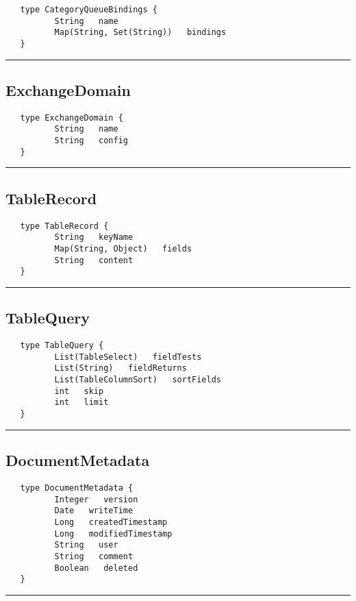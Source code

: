 \begin{verbatim}
   type CategoryQueueBindings {
          String   name
          Map(String, Set(String))   bindings
   }
\end{verbatim}

\rule{15cm}{2pt}
\subsection{ExchangeDomain}
\label{type:ExchangeDomain}

\begin{verbatim}
   type ExchangeDomain {
          String   name
          String   config
   }
\end{verbatim}

\rule{15cm}{2pt}
\subsection{TableRecord}
\label{type:TableRecord}

\begin{verbatim}
   type TableRecord {
          String   keyName
          Map(String, Object)   fields
          String   content
   }
\end{verbatim}

\rule{15cm}{2pt}
\subsection{TableQuery}
\label{type:TableQuery}

\begin{verbatim}
   type TableQuery {
          List(TableSelect)   fieldTests
          List(String)   fieldReturns
          List(TableColumnSort)   sortFields
          int   skip
          int   limit
   }
\end{verbatim}

\rule{15cm}{2pt}
\subsection{DocumentMetadata}
\label{type:DocumentMetadata}

\begin{verbatim}
   type DocumentMetadata {
          Integer   version
          Date   writeTime
          Long   createdTimestamp
          Long   modifiedTimestamp
          String   user
          String   comment
          Boolean   deleted
   }
\end{verbatim}

\rule{15cm}{2pt}
